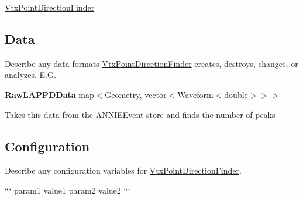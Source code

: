 \hyperlink{classVtxPointDirectionFinder}{Vtx\-Point\-Direction\-Finder}

\subsection*{Data}

Describe any data formats \hyperlink{classVtxPointDirectionFinder}{Vtx\-Point\-Direction\-Finder} creates, destroys, changes, or analyzes. E.\-G.

{\bfseries Raw\-L\-A\-P\-P\-D\-Data} {\ttfamily map$<$\hyperlink{classGeometry}{Geometry}, vector$<$\hyperlink{classWaveform}{Waveform}$<$double$>$$>$$>$}
\begin{DoxyItemize}
\item Takes this data from the {\ttfamily A\-N\-N\-I\-E\-Event} store and finds the number of peaks
\end{DoxyItemize}

\subsection*{Configuration}

Describe any configuration variables for \hyperlink{classVtxPointDirectionFinder}{Vtx\-Point\-Direction\-Finder}.

``` param1 value1 param2 value2 ``` 